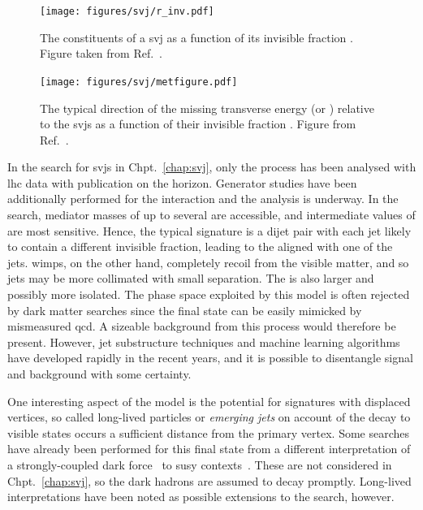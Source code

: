\begin{figure}[htbp]
    \centering
    \texttt{[image: figures/svj/r\_inv.pdf]}
    \caption[The constituents of a semi-visible jet as a function of its invisible fraction]{The constituents of a \gls{svj} as a function of its invisible fraction \rinv. Figure taken from Ref.~.}
    \label{fig:theory_svj_rinv}
\end{figure}
    
\begin{figure}[htbp]
    \centering
    \texttt{[image: figures/svj/metfigure.pdf]}
    \caption[The typical direction of the missing transverse energy relative to the semi-visible jets as a function of the invisible fraction \rinv]{The typical direction of the missing transverse energy \ETslash\xspace (or \ptmiss) relative to the \glspl{svj} as a function of their invisible fraction \rinv. Figure from Ref.~.}
    \label{fig:theory_svj_met_dir}
\end{figure}

In the search for \glspl{svj} in Chpt.~\ref{chap:svj}, only the \schannel process has been analysed with \acrshort{lhc} data with publication on the horizon. Generator studies have been additionally performed for the \tchannel interaction and the analysis is underway. In the \schannel search, mediator masses of up to several \TeVns are accessible, and intermediate values of \rinv are most sensitive. Hence, the typical signature is a dijet pair with each \gls{jet} likely to contain a different invisible fraction, leading to the \ptvecmiss aligned with one of the \glspl{jet}. \glspl{wimp}, on the other hand, completely recoil from the visible matter, and so \glspl{jet} may be more collimated with small separation. The \ptmiss is also larger and possibly more isolated. The phase space exploited by this model is often rejected by dark matter searches since the final state can be easily mimicked by mismeasured \acrshort{qcd}. A sizeable background from this process would therefore be present. However, \gls{jet} substructure techniques and machine learning algorithms have developed rapidly in the recent years, and it is possible to disentangle signal and background with some certainty.

One interesting aspect of the model is the potential for signatures with displaced vertices, so called long-lived particles or \emph{emerging jets} on account of the decay to visible states occurs a sufficient distance from the primary vertex. Some searches have already been performed for this final state from a different interpretation of a strongly-coupled dark force~\cite{Sirunyan:2018njd} to \acrlong{susy} contexts~\cite{SUS16038published}. These are not considered in Chpt.~\ref{chap:svj}, so the dark hadrons are assumed to decay promptly. Long-lived interpretations have been noted as possible extensions to the search, however.

